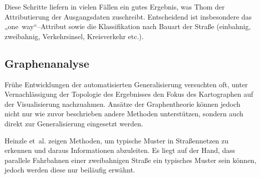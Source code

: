 \documentclass[../main/thesis.tex]{subfiles}
\begin{document}
Diese Schritte liefern in vielen Fällen ein gutes Ergebnis, was Thom der Attributierung der Ausgangsdaten zuschreibt.
Entscheidend ist insbesondere das „one~way“–Attribut sowie die Klassifikation nach Bauart der Straße (einbahnig, zweibahnig, Verkehrsinsel, Kreisverkehr etc.). 


\subsection{Graphenanalyse}
\label{ch:graph-based}



Frühe Entwicklungen der automatisierten Generalisierung versuchten oft, unter Vernachlässigung der Topologie des Ergebnisses den Fokus des Kartographen auf der Visualisierung nachzuahmen. 
Ansätze der Graphentheorie können jedoch nicht nur wie zuvor beschrieben andere Methoden unterstützen, sondern auch direkt zur Generalisierung eingesetzt werden.


Heinzle et~al. zeigen Methoden, um typische Muster in Straßennetzen zu erkennen und daraus Informationen abzuleiten. 
Es liegt auf der Hand, dass parallele Fahrbahnen einer zweibahnigen Straße ein typisches Muster sein können, jedoch werden diese nur beiläufig erwähnt. 

\end{document}
